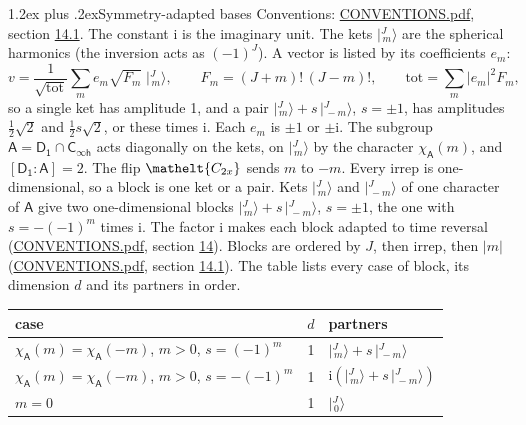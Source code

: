 \documentclass[10pt,a4paper]{article}
\makeatletter
\renewcommand\section{\@startsection{section}{1}{\z@}{-3ex plus -1ex minus -.2ex}%
  {1.2ex plus .2ex}{\normalfont\large\sffamily\bfseries\color{parttitle}}}
\numberwithin{equation}{section}
\newcommand{\eltfont}[1]{{\let\sigma\eltsigma\mathelt{#1}}}
\newcommand{\grp}[1]{\mathsf{#1}}
\newcommand{\elt}[1]{\eltfont{#1}}
\newcommand{\grpindex}[2]{[#1 : #2]}
\newcommand{\iunit}{\mathrm{i}}
\newcommand{\chiA}{\chi_{\grp{A}}}
\newcommand{\jm}[2]{\bigl\lvert{}^{#1}_{\,#2}\bigr\rangle}
\makeatother
\begin{document}
\section{Symmetry-adapted bases}\label{s:bases}
Conventions: \href{../../CONVENTIONS.pdf}{CONVENTIONS.pdf}, section \href{../../CONVENTIONS.pdf\#conv.14.1}{14.1}.
The constant $\iunit$ is the imaginary unit.
\leavevmode\label{n:index.m}\label{n:vector.ket}The kets $\jm{J}{m}$ are the spherical harmonics (the inversion acts as $(-1)^J$). \label{n:index.ketcoefficient}\label{n:vector.basis.symmetry}\label{n:index.ketweight}\label{n:index.total}A vector is listed by its coefficients $e_m$:
\begin{equation}\label{e:ket}v = \frac{1}{\sqrt{\mathrm{tot}}}\sum_m e_m\sqrt{F_m}\;\jm{J}{m},\qquad F_m = (J+m)!\,(J-m)!,\qquad \mathrm{tot} = \sum_m |e_m|^2F_m,\end{equation}
\leavevmode\label{n:index.pair.sign}so a single ket has amplitude 1, and a pair $\jm{J}{m} + s\,\jm{J}{-m}$, $s = \pm1$, has amplitudes $\tfrac{1}{2}\sqrt{2}$ and $\tfrac{1}{2}s\sqrt{2}$, or these times $\iunit$. Each $e_m$ is $\pm1$ or $\pm\iunit$.
\leavevmode\label{n:group.A}\label{n:function.character.abelian}The subgroup $\grp{A} = \grp{D_{1}}\cap\grp{C_{\infty h}}$ acts diagonally on the kets, on $\jm{J}{m}$ by the character $\chiA(m)$, and $\grpindex{\grp{D_{1}}}{\grp{A}} = 2$. The flip $\elt{C_{2x}}$ sends $m$ to $-m$. Every irrep is one-dimensional, so a block is one ket or a pair. Kets $\jm{J}{m}$ and $\jm{J}{-m}$ of one character of $\grp{A}$ give two one-dimensional blocks $\jm{J}{m} + s\,\jm{J}{-m}$, $s = \pm1$, the one with $s = -(-1)^m$ times $\iunit$. The factor $\iunit$ makes each block adapted to time reversal (\href{../../CONVENTIONS.pdf}{CONVENTIONS.pdf}, section \href{../../CONVENTIONS.pdf\#conv.14}{14}). Blocks are ordered by $J$, then irrep, then $|m|$ (\href{../../CONVENTIONS.pdf}{CONVENTIONS.pdf}, section \href{../../CONVENTIONS.pdf\#conv.14.1}{14.1}).
\leavevmode\label{n:head.case}\label{n:head.partners}The table lists every case of block, its dimension $d$ and its partners in order.
\begin{center}\begin{tabular}{@{}lrl@{}}\toprule
case & $d$ & partners\\\midrule
$\chiA(m) = \chiA(-m)$, $m > 0$, $s = (-1)^m$ & 1 & $\jm{J}{m} + s\,\jm{J}{-m}$\\
$\chiA(m) = \chiA(-m)$, $m > 0$, $s = -(-1)^m$ & 1 & $\iunit(\jm{J}{m} + s\,\jm{J}{-m})$\\
$m = 0$ & 1 & $\jm{J}{0}$\\
\bottomrule\end{tabular}\end{center}
\end{document}
